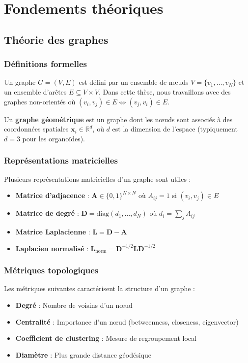 
\chapter{Fondements théoriques}

\section{Théorie des graphes}

\subsection{Définitions formelles}

Un graphe $G = (V, E)$ est défini par un ensemble de nœuds $V = \{v_1, \ldots, v_N\}$ et un ensemble d'arêtes $E \subseteq V \times V$. Dans cette thèse, nous travaillons avec des graphes non-orientés où $(v_i, v_j) \in E \Leftrightarrow (v_j, v_i) \in E$.

Un \textbf{graphe géométrique} est un graphe dont les nœuds sont associés à des coordonnées spatiales $\mathbf{x}_i \in \mathbb{R}^d$, où $d$ est la dimension de l'espace (typiquement $d=3$ pour les organoïdes).

\subsection{Représentations matricielles}

Plusieurs représentations matricielles d'un graphe sont utiles :
\begin{itemize}
    \item \textbf{Matrice d'adjacence} : $\mathbf{A} \in \{0,1\}^{N \times N}$ où $A_{ij} = 1$ si $(v_i, v_j) \in E$
    \item \textbf{Matrice de degré} : $\mathbf{D} = \text{diag}(d_1, \ldots, d_N)$ où $d_i = \sum_j A_{ij}$
    \item \textbf{Matrice Laplacienne} : $\mathbf{L} = \mathbf{D} - \mathbf{A}$
    \item \textbf{Laplacien normalisé} : $\mathbf{L}_{\text{norm}} = \mathbf{D}^{-1/2}\mathbf{L}\mathbf{D}^{-1/2}$
\end{itemize}

\subsection{Métriques topologiques}

Les métriques suivantes caractérisent la structure d'un graphe :
\begin{itemize}
    \item \textbf{Degré} : Nombre de voisins d'un nœud
    \item \textbf{Centralité} : Importance d'un nœud (betweenness, closeness, eigenvector)
    \item \textbf{Coefficient de clustering} : Mesure de regroupement local
    \item \textbf{Diamètre} : Plus grande distance géodésique
\end{itemize}

